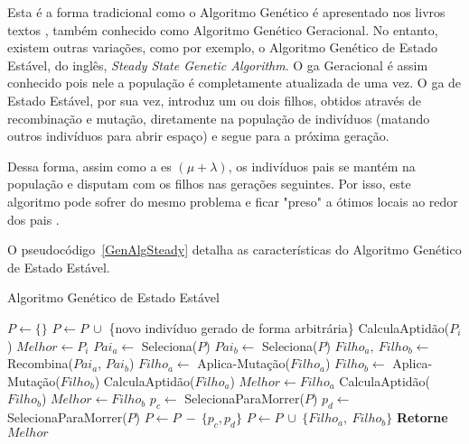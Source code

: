 Esta é a forma tradicional como o Algoritmo Genético é apresentado nos livros 
textos \citep{Luke2013Metaheuristics}, também conhecido como Algoritmo Genético 
Geracional. No entanto, existem outras variações, como por exemplo, o Algoritmo 
Genético de Estado Estável, do inglês, \textit{Steady State Genetic Algorithm}.
O \ac{ga} Geracional é assim conhecido pois nele a população é completamente 
atualizada de uma vez. O \ac{ga} de Estado Estável, por sua vez, introduz um 
ou dois filhos, obtidos através de recombinação e mutação, diretamente na 
população de indivíduos (matando outros indivíduos para abrir espaço) e segue 
para a próxima geração.

Dessa forma, assim como a \ac{es} $( \mu + \lambda )$, os indivíduos pais se 
mantém na população e disputam com os filhos nas gerações seguintes. Por isso, 
este algoritmo pode sofrer do mesmo problema e ficar "preso" a ótimos locais ao 
redor dos pais \citep{Luke2013Metaheuristics}.

O pseudocódigo~\ref{GenAlgSteady} detalha as características do Algoritmo 
Genético de Estado Estável.

\begin{algorithm}[h]                      %
	\caption{Algoritmo Genético de Estado Estável}          %
	\label{GenAlgSteady}                           %
	\begin{algorithmic}                   %
		\State $P \gets \{\} $
			\State $P \gets P \ \cup $ \{novo indivíduo gerado de forma arbitrária\} 
		\EndFor
			\State CalculaAptidão($P_{i}$)
				\State $Melhor \gets P_{i}$
			\EndIf
		\EndFor
		\Repeat
			\State $Pai_{a} \gets $ Seleciona($P$)
			\State $Pai_{b} \gets $ Seleciona($P$)
			\State $Filho_{a},\ Filho_{b} \gets $ Recombina($Pai_{a}$, $Pai_{b}$)
			\State $Filho_{a} \gets $ Aplica-Mutação($Filho_{a}$)
			\State $Filho_{b} \gets $ Aplica-Mutação($Filho_{b}$)
			\State CalculaAptidão($Filho_{a}$)
				\State $Melhor \gets Filho_{a}$
			\EndIf
			\State CalculaAptidão($Filho_{b}$)
				\State $Melhor \gets Filho_{b}$
			\EndIf
			\State $p_{c} \gets $ SelecionaParaMorrer($P$) 
			\State $p_{d} \gets $ SelecionaParaMorrer($P$) 
			\State $P \gets P\ -\ \{p_{c},p_{d}\}$
			\State $P \gets P\ \cup\ \{Filho_{a},\ Filho_{b}\}$
		\State \textbf{Retorne} $Melhor$
		\EndProcedure
	\end{algorithmic}
\end{algorithm}

